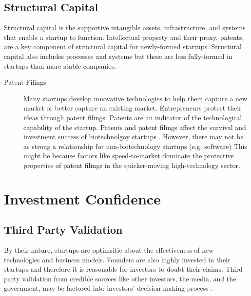 \subsection{Structural Capital}

Structural capital is the supportive intangible assets, infrastructure, and systems that enable a startup to function. Intellectual property and their proxy, patents, are a key component of structural capital for newly-formed startups. Structural capital also includes processes and systems but these are less fully-formed in startups than more stable companies.

\begin{description}

\item[Patent Filings]

Many startups develop innovative technologies to help them capture a new market or better capture an existing market. Entrepreneurs protect their ideas through patent filings. Patents are an indicator of the technological capability of the startup. Patents and patent filings affect the survival and investment success of biotechnolgoy startups \cite{baum2004,hoenen2014}. However, there may not be as strong a relationship for non-biotechnology startups (e.g. software) \cite{gimmon2010,ahlers2015} This might be because factors like speed-to-market dominate the protective properties of patent filings in the quicker-moving high-technology sector.

\end{description}

\section{Investment Confidence}

\subsection{Third Party Validation}

By their nature, startups are optimsitic about the effectiveness of new technologies and business models. Founders are also highly invested in their startups and therefore it is reasonable for investors to doubt their claims. Third party validation from credible sources like other investors, the media, and the government, may be factored into investors' decision-making process \cite{hsu2008,hochberg2007}.

